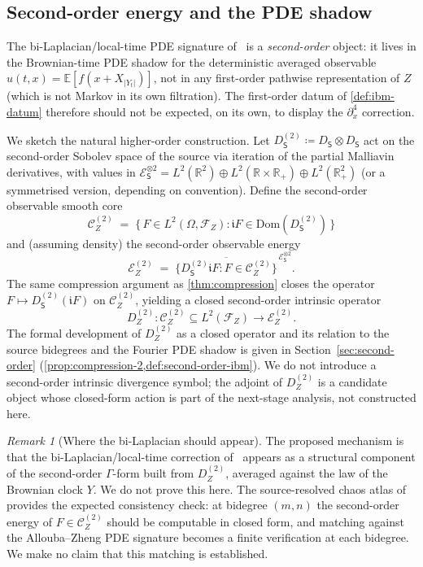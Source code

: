 \documentclass[11pt,reqno]{amsart}
\theoremstyle{plain}
\theoremstyle{definition}
\theoremstyle{remark}
\newtheorem{remark}[theorem]{Remark}
\newcommand{\R}{\mathbb{R}}
\newcommand{\E}{\mathbb{E}}
\newcommand{\Dom}{\mathrm{Dom}}
\newcommand{\Energy}{\mathcal{E}}
\newcommand{\Source}{\mathsf{S}}
\renewcommand{\iota}{\mathfrak{i}}
\newcommand{\IBM}{Z}
\newcommand{\Carre}{\Gamma}
\begin{document}
\subsection{Second-order energy and the PDE shadow}\label{sec:ibm-source-2nd}

The bi-Laplacian/local-time PDE signature of~\cite{AllouZheng} is a
\emph{second-order} object: it lives in the Brownian-time PDE shadow
for the deterministic averaged observable $u(t,x)=\E[f(x+X_{|Y_t|})]$,
not in any first-order pathwise representation of $\IBM$ (which is
not Markov in its own filtration). The first-order datum of
\cref{def:ibm-datum} therefore should not be expected, on its own, to
display the $\partial_x^{4}$ correction.

We sketch the natural higher-order construction. Let
$D_\Source^{(2)}\coloneqq D_\Source\otimes D_\Source$ act on the
second-order Sobolev space of the source via iteration of the partial
Malliavin derivatives, with values in
$\Energy_\Source^{\otimes 2}=L^{2}(\R^{2})\oplus L^{2}(\R\times\R_{+})
\oplus L^{2}(\R_{+}^{2})$ (or a symmetrised version, depending on
convention). Define the second-order observable smooth core
\[
  \mathcal C_\IBM^{(2)}
  \;=\;\bigl\{\,F\in L^{2}(\Omega,\mathcal F_\IBM):
        \iota F\in\Dom(D_\Source^{(2)})\,\bigr\}
\]
and (assuming density) the second-order observable energy
\[
  \Energy_\IBM^{(2)}
  \;=\;\overline{\bigl\{D_\Source^{(2)}\iota F:F\in\mathcal C_\IBM^{(2)}\bigr\}}
       ^{\,\Energy_\Source^{\otimes 2}}.
\]
The same compression argument as \cref{thm:compression} closes the
operator $F\mapsto D_\Source^{(2)}(\iota F)$ on $\mathcal C_\IBM^{(2)}$,
yielding a closed second-order intrinsic operator
\[
  D_\IBM^{(2)}\colon\mathcal C_\IBM^{(2)}\subseteq L^{2}(\mathcal F_\IBM)
  \longrightarrow\Energy_\IBM^{(2)}.
\]
The formal development of $D_\IBM^{(2)}$ as a closed operator and its
relation to the source bidegrees and the Fourier PDE shadow is given
in Section~\ref{sec:second-order} (\cref{prop:compression-2,def:second-order-ibm}).
We do not introduce a second-order intrinsic divergence symbol; the
adjoint of $D_\IBM^{(2)}$ is a candidate object whose closed-form
action is part of the next-stage analysis, not constructed here.

\begin{remark}[Where the bi-Laplacian should appear]\label{rem:bilap-where}
The proposed mechanism is that the bi-Laplacian/local-time correction
of~\cite{AllouZheng} appears as a structural component of the
second-order $\Carre$-form built from $D_\IBM^{(2)}$, averaged against
the law of the Brownian clock $Y$. We do not prove this here. The
source-resolved chaos atlas of~\cite{Fontes-IBMchaos} provides the
expected consistency check: at bidegree $(m,n)$ the second-order energy
of $F\in\mathcal C_\IBM^{(2)}$ should be computable in closed form, and
matching against the Allouba--Zheng PDE signature becomes a finite
verification at each bidegree. We make no claim that this matching is
established.
\end{remark}
\end{document}
